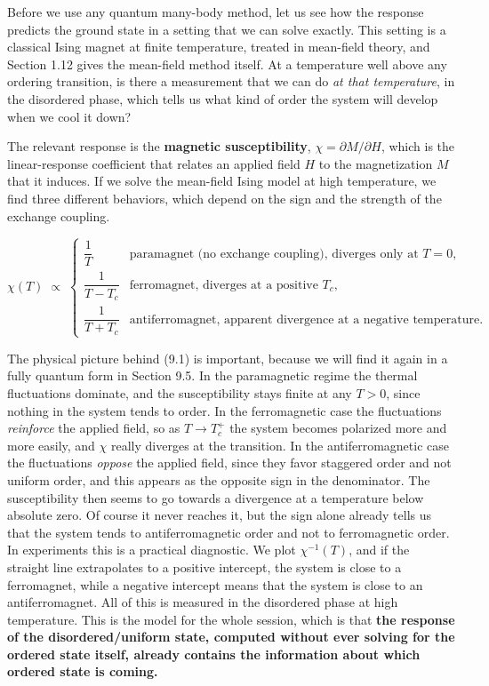 Before we use any quantum many-body method, let us see how the response predicts the ground state
in a setting that we can solve exactly. This
setting is a classical Ising magnet at finite temperature, treated in mean-field theory, and
Section 1.12 gives the mean-field method itself. At a temperature well above any ordering transition, is there a measurement that we can do
\emph{at that temperature}, in the disordered phase, which tells us what kind of order the system will
develop when we cool it down?

The relevant response is the \textbf{magnetic susceptibility}, $\chi = \partial M/\partial H$, which is
the linear-response coefficient that relates an applied field $H$ to the magnetization $M$ that it
induces. If we solve the mean-field Ising model at high temperature, we find three different
behaviors, which depend on the sign and the strength of the exchange coupling.

\begin{equation}
\chi(T) \;\propto\;
\begin{cases}
\dfrac{1}{T} & \text{paramagnet (no exchange coupling), diverges only at } T=0, \\[4pt]
\dfrac{1}{T - T_c} & \text{ferromagnet, diverges at a positive } T_c, \\[4pt]
\dfrac{1}{T + T_c} & \text{antiferromagnet, apparent divergence at a negative temperature.}
\end{cases}
\end{equation}

The physical picture behind (9.1) is important, because we will find it again in a fully quantum
form in Section 9.5. In the paramagnetic regime the thermal fluctuations dominate, and the
susceptibility stays finite at any $T>0$, since nothing in the system tends to order. In the
ferromagnetic case the fluctuations \emph{reinforce} the applied field, so as $T\to T_c^+$ the
system becomes polarized more and more easily, and $\chi$ really diverges at the transition. In the
antiferromagnetic case the fluctuations \emph{oppose} the applied field, since they favor staggered
order and not uniform order, and this appears as the opposite sign in the denominator. The
susceptibility then seems to go towards a divergence at a temperature below absolute zero. Of course
it never reaches it, but the sign alone already tells us that the system tends to antiferromagnetic
order and not to ferromagnetic order. In experiments this is a practical diagnostic. We plot
$\chi^{-1}(T)$, and if the straight line extrapolates to a positive intercept, the system is close to
a ferromagnet, while a negative intercept means that the system is close to an antiferromagnet.
All of this is measured in the disordered phase at high temperature. This is the model for the whole
session, which is that \textbf{the response of the disordered/uniform state,
computed without ever solving for the ordered state itself, already contains the information about
which ordered state is coming.}

